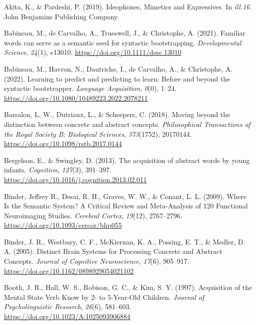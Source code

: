 \documentclass[
  man,floatsintext]{apa6}
\newlength{\cslhangindent}
\newenvironment{CSLReferences}[2] %
 {\begin{list}{}{%
  \setlength{\itemindent}{0pt}
  \setlength{\leftmargin}{0pt}
  \setlength{\parsep}{0pt}
  \ifodd #1
   \setlength{\leftmargin}{\cslhangindent}
   \setlength{\itemindent}{-1\cslhangindent}
  \fi
  \setlength{\itemsep}{#2\baselineskip}}}
 {\end{list}}
\begin{document}
\label{refs}
\begin{CSLReferences}{1}{0}
Akita, K., \& Pardeshi, P. (2019). Ideophones, {Mimetics} and {Expressives}. In \emph{ill.16}. John Benjamins Publishing Company.

Babineau, M., de Carvalho, A., Trueswell, J., \& Christophe, A. (2021). Familiar words can serve as a semantic seed for syntactic bootstrapping. \emph{Developmental Science}, \emph{24}(1), e13010. \url{https://doi.org/10.1111/desc.13010}

Babineau, M., Havron, N., Dautriche, I., de Carvalho, A., \& Christophe, A. (2022). Learning to predict and predicting to learn: {Before} and beyond the syntactic bootstrapper. \emph{Language Acquisition}, \emph{0}(0), 1--24. \url{https://doi.org/10.1080/10489223.2022.2078211}

Barsalou, L. W., Dutriaux, L., \& Scheepers, C. (2018). Moving beyond the distinction between concrete and abstract concepts. \emph{Philosophical Transactions of the Royal Society B: Biological Sciences}, \emph{373}(1752), 20170144. \url{https://doi.org/10.1098/rstb.2017.0144}

Bergelson, E., \& Swingley, D. (2013). The acquisition of abstract words by young infants. \emph{Cognition}, \emph{127}(3), 391--397. \url{https://doi.org/10.1016/j.cognition.2013.02.011}

Binder, Jeffrey R., Desai, R. H., Graves, W. W., \& Conant, L. L. (2009). Where {Is} the {Semantic System}? {A Critical Review} and {Meta-Analysis} of 120 {Functional Neuroimaging Studies}. \emph{Cerebral Cortex}, \emph{19}(12), 2767--2796. \url{https://doi.org/10.1093/cercor/bhp055}

Binder, J. R., Westbury, C. F., McKiernan, K. A., Possing, E. T., \& Medler, D. A. (2005). Distinct {Brain Systems} for {Processing Concrete} and {Abstract Concepts}. \emph{Journal of Cognitive Neuroscience}, \emph{17}(6), 905--917. \url{https://doi.org/10.1162/0898929054021102}

Booth, J. R., Hall, W. S., Robison, G. C., \& Kim, S. Y. (1997). Acquisition of the {Mental State Verb Know} by 2- to 5-{Year-Old Children}. \emph{Journal of Psycholinguistic Research}, \emph{26}(6), 581--603. \url{https://doi.org/10.1023/A:1025093906884}


\end{CSLReferences}
\end{document}
